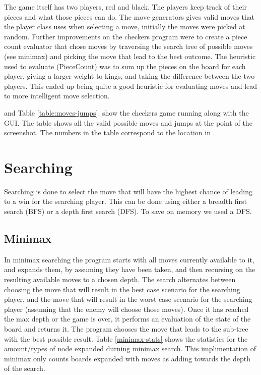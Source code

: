 \documentclass{article}
\begin{document}
The game itself has two players, red and black. The players keep track of their pieces and what
those pieces can do. The move generators gives valid moves that
the player class uses when selecting a move, initially the moves were picked at
random. Further improvements on the checkers program were to create a piece
count evaluator that chose moves by traversing the search tree of possible
moves (see minimax) and picking the move that lead to the best outcome. The
heuristic used to evaluate (PieceCount) was to sum up the pieces on the board for each
player, giving a larger weight to kings, and taking the difference between the
two players. This ended up being quite a good heuristic for evaluating moves
and lead to more intelligent move selection.

 and Table \ref{table:moves-jumps}. show the checkers game running along with the GUI.
The table shows all the valid possible moves and jumps at the point of the
screenshot. The numbers in the table correspond to the location in .

\section{Searching}

Searching is done to select the move that will have the highest chance of
leading to a win for the searching player.  This can be done using either a
breadth first search (BFS) or a depth first search (DFS). To save on memory
we used a DFS.

\subsection{Minimax}

In minimax searching the program starts with all moves currently available to
it, and expands them, by assuming they have been taken, and then recursing on
the resulting available moves to a chosen depth. The search alternates between
choosing the move that will result in the best case scenario for the searching
player, and the move that will result in the worst case scenario for the
searching player (assuming that the enemy will choose those moves). Once it has
reached the max depth or the game is over, it performs an evaluation of the
state of the board and returns it. The program chooses the move that leads to
the sub-tree with the best possible result. Table \ref{minimax-stats} shows the
statistics for the amount/types of node expanded durning minimax search. This
implimentation of minimax only counts boards expanded with moves as adding towards
the depth of the search.
\end{document}
